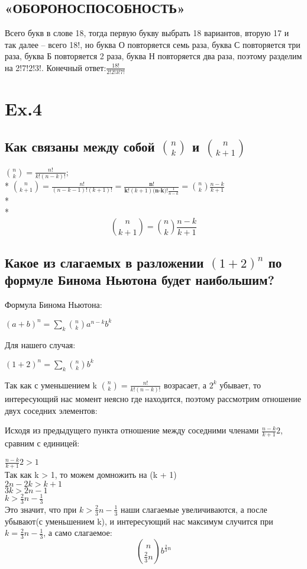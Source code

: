\documentclass[a4paper,11pt]{article}
\begin{document}
\subsection{«ОБОРОНОСПОСОБНОСТЬ»}
 Всего букв в слове 18, тогда первую букву выбрать 18 вариантов, вторую 17 и так далее -- всего 18!, но буква О повторяется семь раза, буква С повторяется три раза, буква Б повторяется 2 раза, буква Н повторяется два раза, поэтому разделим на 2!7!2!3!.
 Конечный ответ:$\frac{18!}{2!2!3!7!}$	
 
 \section{Ex.4}
 \subsection{Как связаны между собой ${n \choose k}$ и ${n \choose k + 1}$}
 ${n \choose k} = \frac{n!}{k!(n-k)!};$ \\*
 ${n \choose k + 1} =\frac{n!}{(n - k - 1)!(k+1)!} = \frac{\textbf{n!}}{\textbf{k!} (k + 1) \textbf{(n-k)!} \frac{1}{n-k}}= {n \choose k} \frac{n-k}{k+1}$ \\*\\*
 \[{n \choose k + 1} =  {n \choose k} \frac{n-k}{k+1}\]

 \subsection{Какое из слагаемых в разложении $(1 + 2)^n$ по формуле Бинома Ньютона будет наибольшим?}
 
 Формула Бинома Ньютона:
 \begin{center}
	$(a + b)^n = \sum\limits_{k}{n \choose k} a^{n-k} b^k $
\end{center}

Для нашего случая:
\begin{center}
	$(1 + 2)^n = \sum\limits_{k}{n \choose k} b^k $
\end{center}

Так как с уменьшением k  ${n \choose k}=\frac{n!}{k!(n-k)!}$ возрасает, а $2^k$ убывает, то интересующий нас момент неясно где находится, поэтому рассмотрим отношение двух соседних элементов:

Исходя из предыдущего пункта отношение между соседними членами $ \frac{n-k}{k+1} 2 $, сравним с единицей:

\begin{center}
$ \frac{n-k}{k+1} 2 > 1 $ \\
Так как k > 1, то можем домножить на (k + 1)\\
$ 2n - 2k > k + 1 $\\
$ 3k > 2n - 1 $\\
$ k > \frac{2}{3}n - \frac{1}{3} $\\
Это значит, что при $ k > \frac{2}{3}n - \frac{1}{3} $ наши слагаемые увеличиваются, а после убывают(с уменьшением k), и интересующий нас максимум случится при $k = \frac{2}{3}n - \frac{1}{3}$, а само слагаемое: \[{n \choose \frac{2}{3}n}  b^{\frac{2}{3}n} \]
\end{center}
\end{document}

